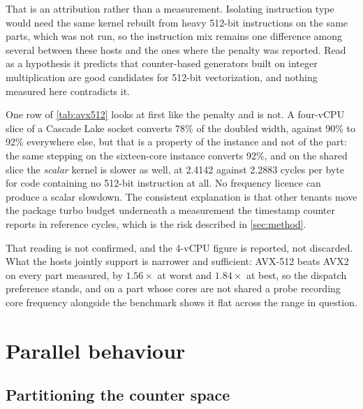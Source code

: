 \documentclass[acmsmall,screen,review]{acmart}
\theoremstyle{acmdefinition}
\begin{document}
That is an attribution rather than a measurement. Isolating instruction type
would need the same kernel rebuilt from heavy 512-bit instructions on the same
parts, which was not run, so the instruction mix remains one difference among
several between these hosts and the ones where the penalty was reported. Read as
a hypothesis it predicts that counter-based generators built on integer
multiplication are good candidates for 512-bit vectorization, and nothing
measured here contradicts it.

One row of \cref{tab:avx512} looks at first like the penalty and is not. A
four-vCPU slice of a Cascade Lake socket converts 78\% of the doubled width,
against 90\% to 92\% everywhere else, but that is a property of the instance
and not of the part: the same stepping on the sixteen-core instance converts
92\%, and on the shared slice the \emph{scalar} kernel is slower as well, at
2.4142 against 2.2883 cycles per byte for code containing no 512-bit
instruction at all. No frequency licence can produce a scalar slowdown. The
consistent explanation is that other tenants move the package turbo budget
underneath a measurement the timestamp counter reports in reference cycles,
which is the risk described in \cref{sec:method}.

That reading is not confirmed, and the 4-vCPU figure is reported, not
discarded. What the hosts jointly support is narrower and sufficient: AVX-512
beats AVX2 on every part measured, by $1.56\times$ at worst and $1.84\times$ at
best, so the dispatch preference stands, and on a part whose cores are not
shared a probe recording core frequency alongside the benchmark shows it flat
across the range in question.

\section{Parallel behaviour}\label{sec:parallel}

\subsection{Partitioning the counter space}\label{sec:partition}
\end{document}
